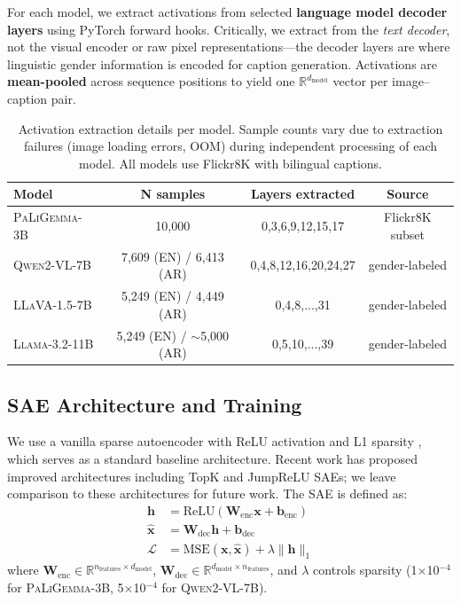 \documentclass[11pt,a4paper]{article}
\newcommand{\modelname}[1]{\textsc{#1}}
\newcommand{\pali}{\modelname{PaLiGemma-3B}}
\newcommand{\qwen}{\modelname{Qwen2-VL-7B}}
\newcommand{\llama}{\modelname{Llama-3.2-11B}}
\newcommand{\llava}{\modelname{LLaVA-1.5-7B}}
\begin{document}
For each model, we extract activations from selected \textbf{language model decoder layers} using PyTorch forward hooks.
Critically, we extract from the \emph{text decoder}, not the visual encoder or raw pixel representations---the decoder layers are where linguistic gender information is encoded for caption generation.
Activations are \textbf{mean-pooled} across sequence positions to yield one $\mathbb{R}^{d_{\text{model}}}$ vector per image--caption pair.

\begin{table}[h]
\centering
\small
\caption{Activation extraction details per model. Sample counts vary due to extraction failures (image loading errors, OOM) during independent processing of each model. All models use Flickr8K with bilingual captions.}
\label{tab:extraction}
\begin{tabular}{@{}lccc@{}}
\toprule
\textbf{Model} & \textbf{N samples} & \textbf{Layers extracted} & \textbf{Source} \\
\midrule
\pali{}  & 10,000 & 0,3,6,9,12,15,17 & Flickr8K subset \\
\qwen{}  & 7,609 (EN) / 6,413 (AR) & 0,4,8,12,16,20,24,27 & gender-labeled \\
\llava{} & 5,249 (EN) / 4,449 (AR) & 0,4,8,...,31 & gender-labeled \\
\llama{} & 5,249 (EN) / $\sim$5,000 (AR) & 0,5,10,...,39 & gender-labeled \\
\bottomrule
\end{tabular}
\end{table}

\subsection{SAE Architecture and Training}

We use a vanilla sparse autoencoder with ReLU activation and L1 sparsity \citep{bricken2023monosemanticity}, which serves as a standard baseline architecture.
Recent work has proposed improved architectures including TopK \citep{gao2024scaling} and JumpReLU \citep{rajamanoharan2024jumping} SAEs; we leave comparison to these architectures for future work.
The SAE is defined as:
\begin{align}
    \mathbf{h} &= \text{ReLU}(\mathbf{W}_{\text{enc}} \mathbf{x} + \mathbf{b}_{\text{enc}}) \label{eq:enc} \\
    \hat{\mathbf{x}} &= \mathbf{W}_{\text{dec}} \mathbf{h} + \mathbf{b}_{\text{dec}} \label{eq:dec} \\
    \mathcal{L} &= \text{MSE}(\mathbf{x}, \hat{\mathbf{x}}) + \lambda \|\mathbf{h}\|_1 \label{eq:loss}
\end{align}
where $\mathbf{W}_{\text{enc}} \in \mathbb{R}^{n_{\text{features}} \times d_{\text{model}}}$, $\mathbf{W}_{\text{dec}} \in \mathbb{R}^{d_{\text{model}} \times n_{\text{features}}}$, and $\lambda$ controls sparsity (1$\times$10$^{-4}$ for \pali{}, 5$\times$10$^{-4}$ for \qwen{}).
\end{document}
